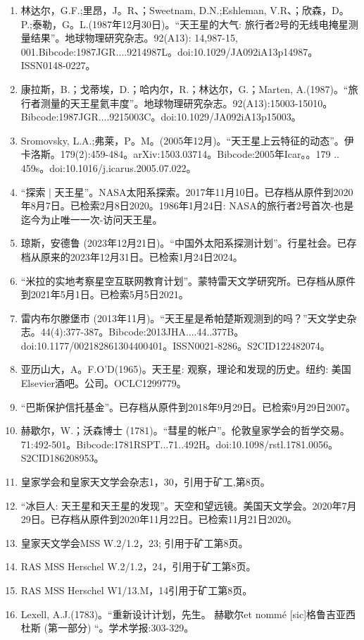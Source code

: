 \begin{enumerate}
\item 林达尔，G.F.;里昂，J。R、；Sweetnam, D.N.;Eshleman, V.R、；欣森，D。P.;泰勒，G。L.(1987年12月30日)。“天王星的大气: 旅行者2号的无线电掩星测量结果”。地球物理研究杂志。92(A13): 14,987-15, 001.Bibcode:1987JGR....9214987L。doi:10.1029/JA092iA13p14987。ISSN0148-0227。  
\item 康拉斯，B.；戈蒂埃，D.；哈内尔，R.；林达尔，G.；Marten, A.(1987)。“旅行者测量的天王星氦丰度”。地球物理研究杂志。92(A13):15003-15010。Bibcode:1987JGR....9215003C。doi:10.1029/JA092iA13p15003。
\item Sromovsky, L.A.;弗莱，P。M。(2005年12月)。“天王星上云特征的动态”。伊卡洛斯。179(2):459-484。arXiv:1503.03714。Bibcode:2005年Icar。。179 .. 459s。doi:10.1016/j.icarus.2005.07.022。
\item “探索 | 天王星”。NASA太阳系探索。2017年11月10日。已存档从原件到2020年8月7日。已检索2月8日2020。1986年1月24日: NASA的旅行者2号首次-也是迄今为止唯一一次-访问天王星。
\item 琼斯，安德鲁 (2023年12月21日)。“中国外太阳系探测计划”。行星社会。已存档从原来的2023年12月31日。已检索1月24日2024。
\item “米拉的实地考察星空互联网教育计划”。蒙特雷天文学研究所。已存档从原件到2021年5月1日。已检索5月5日2021。
\item 雷内布尔滕堡市 (2013年11月)。“天王星是希帕楚斯观测到的吗？”天文学史杂志。44(4):377-387。Bibcode:2013JHA....44..377B。doi:10.1177/002182861304400401。ISSN0021-8286。S2CID122482074。  
\item 亚历山大，A。F.O'D(1965)。天王星: 观察，理论和发现的历史。纽约: 美国Elsevier酒吧。公司。OCLC1299779。 
\item “巴斯保护信托基金”。已存档从原件到2018年9月29日。已检索9月29日2007。
\item 赫歇尔，W.；沃森博士 (1781)。“彗星的帐户”。伦敦皇家学会的哲学交易。71:492-501。Bibcode:1781RSPT...71..492H。doi:10.1098/rstl.1781.0056。S2CID186208953。 
\item 皇家学会和皇家天文学会杂志1，30，引用于矿工,第8页。
\item “冰巨人: 天王星和天王星的发现”。天空和望远镜。美国天文学会。2020年7月29日。已存档从原件到2020年11月22日。已检索11月21日2020。
\item 皇家天文学会MSS W.2/1.2，23; 引用于矿工第8页。
\item RAS MSS Herschel W.2/1.2，24，引用于矿工第8页。
\item RAS MSS Herschel W1/13.M，14引用于矿工第8页。
\item Lexell, A.J.(1783)。“重新设计计划，先生。 赫歇尔et nommé [sic]格鲁吉亚西杜斯 (第一部分) “。学术学报:303-329。

\end{enumerate}
